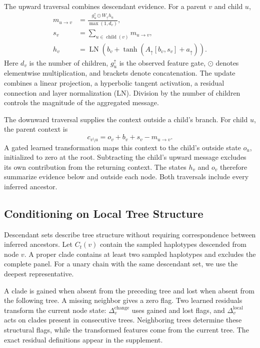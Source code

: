 \documentclass[letterpaper]{article}
\begin{document}
The upward traversal combines descendant evidence. For a parent $v$ and child $u$,
\begin{align}
m_{u\to v}
 &= \frac{g_u^\uparrow\odot W_\uparrow h_u}{\max(1,d_v)},\\
s_v &= \sum_{u\in\operatorname{child}(v)}m_{u\to v},\\
h_v &= \operatorname{LN}\!\left(
 b_v+\tanh(A_\uparrow[b_v,s_v]+a_\uparrow)\right).
\end{align}
Here $d_v$ is the number of children, $g_u^\uparrow$ is the observed feature gate, $\odot$ denotes elementwise multiplication, and brackets denote concatenation. The update combines a linear projection, a hyperbolic tangent activation, a residual connection and layer normalization (LN). Division by the number of children controls the magnitude of the aggregated message.

The downward traversal supplies the context outside a child's branch. For child $u$, the parent context is
\begin{equation}
c_{v\setminus u}=o_v+b_v+s_v-m_{u\to v}.
\label{eq:outside}
\end{equation}
A gated learned transformation maps this context to the child's outside state $o_u$, initialized to zero at the root. Subtracting the child's upward message excludes its own contribution from the returning context. The states $h_v$ and $o_v$ therefore summarize evidence below and outside each node. Both traversals include every inferred ancestor.

\subsection{Conditioning on Local Tree Structure}
\label{sec:structure}
Descendant sets describe tree structure without requiring correspondence between inferred ancestors. Let $C_t(v)$ contain the sampled haplotypes descended from node $v$. A proper clade contains at least two sampled haplotypes and excludes the complete panel. For a unary chain with the same descendant set, we use the deepest representative.

A clade is gained when absent from the preceding tree and lost when absent from the following tree. A missing neighbor gives a zero flag. Two learned residuals transform the current node state: $\Delta_v^{\mathrm{change}}$ uses gained and lost flags, and $\Delta_v^{\mathrm{local}}$ acts on clades present in consecutive trees. Neighboring trees determine these structural flags, while the transformed features come from the current tree. The exact residual definitions appear in the supplement.
\end{document}
